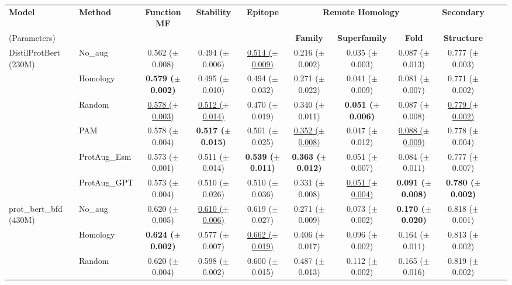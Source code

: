 \documentclass{article}
\begin{document}
\begin{table}[t]
    \centering
    \tiny
    \begin{tabular}{llccccccccc}
    \hline
    \textbf{Model} & \textbf{Method} & \textbf{Function MF} & \textbf{Stability} & \textbf{Epitope} & \multicolumn{3}{c}{\textbf{Remote Homology}} & \textbf{Secondary} \\ 
    (Parameters)& & & & & \textbf{Family} & \textbf{Superfamily} & \textbf{Fold} & \textbf{Structure}\\
    \hline
    \multirow{6}{*}{DistilProtBert (230M)} 
    & No\_aug & 0.562 ($\pm$0.008) & 0.494 ($\pm$0.006) & \underline{0.514 ($\pm$0.009)} & 0.216 ($\pm$0.002) & 0.035 ($\pm$0.003) & 0.087 ($\pm$0.013) & 0.777 ($\pm$0.003) \\
    & Homology & \textbf{0.579 ($\pm$0.002)} & 0.495 ($\pm$0.010) & 0.494 ($\pm$0.032) & 0.271 ($\pm$0.022) & 0.041 ($\pm$0.009) & 0.081 ($\pm$0.007) & 0.771 ($\pm$0.002) \\
    & Random & \underline{0.578 ($\pm$0.003)} & \underline{0.512 ($\pm$0.014)} & 0.470 ($\pm$0.019) & 0.340 ($\pm$0.011) & \textbf{0.051 ($\pm$0.006)} & 0.087 ($\pm$0.008) & \underline{0.779 ($\pm$0.002)} \\
    & PAM & 0.578 ($\pm$0.004) & \textbf{0.517 ($\pm$0.015)} & 0.501 ($\pm$0.025) & \underline{0.352 ($\pm$0.008)} & 0.047 ($\pm$0.012) & \underline{0.088 ($\pm$0.009)} & 0.778 ($\pm$0.004) \\
    & ProtAug\_Esm & 0.573 ($\pm$0.001) & 0.511 ($\pm$0.014) & \textbf{0.539 ($\pm$0.011)} & \textbf{0.363 ($\pm$0.012)} & 0.051 ($\pm$0.007) & 0.084 ($\pm$0.011) & 0.777 ($\pm$0.007) \\
    & ProtAug\_GPT & 0.573 ($\pm$0.004) & 0.510 ($\pm$0.026) & 0.510 ($\pm$0.036) & 0.331 ($\pm$0.008) & \underline{0.051 ($\pm$0.004)} & \textbf{0.091 ($\pm$0.008)} & \textbf{0.780 ($\pm$0.002)} \\
    \hline
    \multirow{6}{*}{prot\_bert\_bfd (430M)} 
    & No\_aug & 0.620 ($\pm$0.005) & \underline{0.610 ($\pm$0.006)} & 0.619 ($\pm$0.027) & 0.271 ($\pm$0.009) & 0.073 ($\pm$0.002) & \textbf{0.170 ($\pm$0.020)} & 0.818 ($\pm$0.001) \\
    & Homology & \textbf{0.624 ($\pm$0.002)} & 0.577 ($\pm$0.007) & \cellcolor[gray]{0.8}\underline{0.662 ($\pm$0.019)} & 0.406 ($\pm$0.017) & 0.096 ($\pm$0.002) & 0.164 ($\pm$0.011) & 0.813 ($\pm$0.002) \\
    & Random & 0.620 ($\pm$0.004) & 0.598 ($\pm$0.002) & 0.600 ($\pm$0.015) & 0.487 ($\pm$0.013) & 0.112 ($\pm$0.002) & 0.165 ($\pm$0.016) & 0.819 ($\pm$0.002) \\

\end{tabular}
\end{table}
\end{document}
